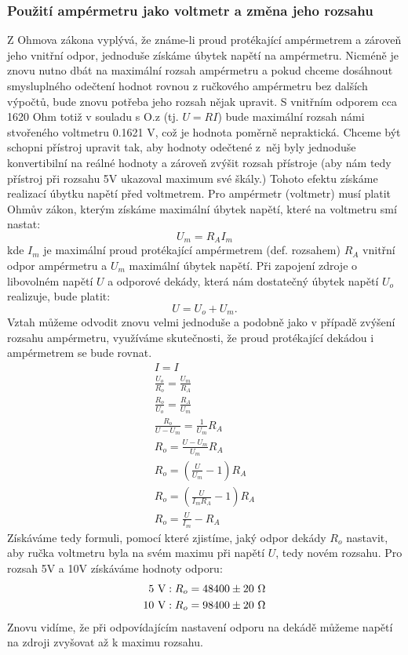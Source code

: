 \documentclass[czech,11pt,a4paper]{article}
\begin{document}
		\subsubsection{Použití ampérmetru jako voltmetr a změna jeho rozsahu}
		Z Ohmova zákona vyplývá, že známe-li proud protékající ampérmetrem a zároveň jeho vnitřní odpor, jednoduše získáme úbytek napětí na ampérmetru. Nicméně je znovu nutno dbát na maximální rozsah ampérmetru a pokud chceme dosáhnout smysluplného odečtení hodnot rovnou z ručkového ampérmetru bez dalších výpočtů, bude znovu potřeba jeho rozsah nějak upravit. S vnitřním odporem cca 1620 Ohm totiž v souladu s O.z (tj. $U = RI$) bude maximální rozsah námi stvořeného voltmetru 0.1621 V, což je hodnota poměrně nepraktická. Chceme být schopni přístroj upravit tak, aby hodnoty odečtené z~něj byly jednoduše konvertibilní na reálné hodnoty a zároveň zvýšit rozsah přístroje (aby nám tedy přístroj při rozsahu 5V ukazoval maximum své škály.) Tohoto efektu získáme realizací úbytku napětí před voltmetrem.
		Pro ampérmetr (voltmetr) musí platit Ohmův zákon, kterým získáme maximální úbytek napětí, které na voltmetru smí nastat:
		\begin{equation}
			U_m = R_A I_m
		\end{equation}
		kde $I_m$ je maximální proud protékající ampérmetrem (def. rozsahem) $R_A$ vnitřní odpor ampérmetru a $U_m$ maximální úbytek napětí. Při zapojení zdroje o libovolném napětí $U$ a odporové dekády, která nám dostatečný úbytek napětí $U_o$ realizuje, bude platit:
		\begin{equation}
			U = U_o + U_m.
		\end{equation} Vztah můžeme odvodit znovu velmi jednoduše a podobně jako v případě zvýšení rozsahu ampérmetru, využíváme skutečnosti, že proud protékající dekádou i ampérmetrem se bude rovnat.
		\begin{gather*}
			I = I \\
			\frac{U_o}{R_o} = \frac{U_m}{R_A} \\
			\frac{R_o}{U_o} = \frac{R_A}{U_m} \\
			\frac{R_o}{U - U_m} = \frac 1 {U_m} R_A \\
			R_o = \frac{U - U_m}{U_m}R_A \\
			R_o = \left(\frac{U}{U_m} -1\right) R_A\\			
			R_o = \left(\frac{U}{I_m R_A} -1\right) R_A\\			
			R_o = \frac{U}{I_m} - R_A
		\end{gather*} Získáváme tedy formuli, pomocí které zjistíme, jaký odpor dekády $R_o$ nastavit, aby ručka voltmetru byla na svém maximu při napětí $U$, tedy novém rozsahu. Pro rozsah 5V a 10V získáváme hodnoty odporu:
		\begin{align*}
			5 \text{ V}: R_o = 48 400 \pm 20 \text{ $\Omega$} \\
			10 \text{ V}: R_o = 98400 \pm 20 \text{ $ \Omega$} 
		\end{align*} Znovu vidíme, že při odpovídajícím nastavení odporu na dekádě můžeme napětí na zdroji zvyšovat až k maximu rozsahu.
\end{document}
